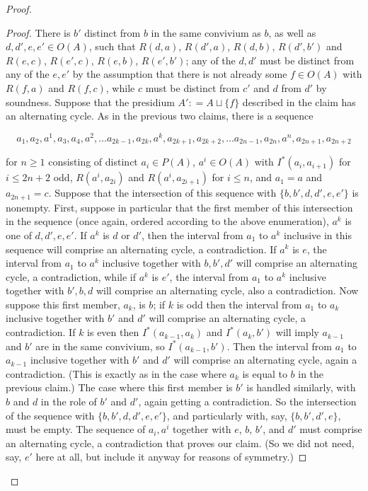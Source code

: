 \documentclass{amsart}
\theoremstyle{definition}
\theoremstyle{remark}
\numberwithin{equation}{section}
\begin{document}
\begin{proof}
\begin{proof}
    There is $b'$ distinct from $b$ in the same convivium as $b$, as well as $d, d', e, e' \in O(A)$, such that $R(d, a)$, $R(d', a)$, $R(d, b)$, $R(d', b')$ and $R(e, c)$, $R(e', c)$, $R(e, b)$, $R(e', b')$; any of the $d, d'$ must be distinct from any of the $e, e'$ by the assumption that  there is not already some $f\in O(A)$ with $R(f, a)$ and $R(f, c)$, while $c$ must be distinct from $c'$ and $d$ from $d'$ by soundness. Suppose that the presidium $A' : = A \sqcup \{f\}$ described in the claim has an alternating cycle. As  in the previous two claims, there is a sequence 

  $$a_1, a_2, a^{1}, a_{3}, a_{4}, a^{2}, \ldots a_{2k-1}, a_{2k}, a^{k}, a_{2k+1}, a_{2k+2}, \ldots a_{2n-1}, a_{2n}, a^{n}, a_{2n+1}, a_{2n+2} $$

for $n \geq 1$ consisting of distinct $a_i \in P(A)$, $a^i \in O(A)$ with $I^{*}(a_i, a_{i+1})$ for $i \leq 2n+2$ odd, $R(a^i, a_{2i})$ and $R(a^i, a_{2i+1})$ for $i \leq n$,  and $a_1 = a$ and $a_{2n+1} = c$. Suppose that the intersection of this sequence with $\{b, b', d, d', e, e'\}$ is nonempty. First, suppose in particular that the first member of this intersection in the sequence (once again, ordered according to the above enumeration), $a^{k}$ is one of $d, d', e, e'$. If $a^{k} $ is $d$ or $d'$, then the interval from $a_1$ to $a^k$ inclusive in this sequence will comprise an alternating cycle, a contradiction. If $a^{k}$ is $e$, the interval from $a_1$ to $a^k$ inclusive together with $b, b', d'$ will comprise an alternating cycle, a contradiction, while if $a^{k}$ is $e'$, the interval from $a_1$ to $a^k$ inclusive together with $b', b, d$ will comprise an alternating cycle, also a contradiction. Now suppose this first member, $a_k$, is $b$; if $k$ is odd then the interval from $a_1$ to $a_k$ inclusive together with $b'$ and $d'$ will comprise an alternating cycle, a contradiction. If $k$ is even then $I^{*}(a_{k-1}, a_{k})$ and $I^{*}(a_{k}, b')$ will imply $a_{k-1}$ and $b'$ are in the same convivium, so $I^{*}(a_{k-1}, b')$. Then the interval from $a_1$ to $a_{k-1}$ inclusive together with $b'$ and  $d'$ will comprise an alternating cycle, again a contradiction. (This is exactly as in the case where $a_{k}$ is equal to $b$ in the previous claim.) The case where this first member is $b'$ is handled similarly, with $b$ and $d$ in the role of $b'$ and $d'$, again getting a contradiction. So the intersection of the sequence with $\{b, b', d, d', e, e'\}$, and particularly with, say, $\{b, b', d', e\}$, must be empty. The sequence of $a_i, a^i$ together with $e$, $b$, $b'$, and $d'$ must comprise an alternating cycle, a contradiction that proves our claim. (So we did not need, say, $e'$ here at all, but include it anyway for reasons of symmetry.)
\end{proof}


\end{proof}
\end{document}
